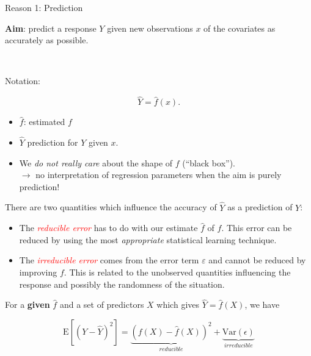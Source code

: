\documentclass[
  ignorenonframetext,
]{beamer}
\providecommand{\tightlist}{%
  \setlength{\itemsep}{0pt}\setlength{\parskip}{0pt}}
\begin{document}
\begin{frame}
\begin{block}{Reason 1: Prediction}
\protect\hypertarget{reason-1-prediction}{}
\(~\)

\textbf{Aim}: predict a response \(Y\) given new observations \(x\) of
the covariates as accurately as possible.

\(~\)

Notation:

\[\hat{Y} = \hat{f}(x).\]

\begin{itemize}
\item
  \(\hat{f}\): estimated \(f\)
\item
  \(\hat{Y}\) prediction for \(Y\) given \(x\).
\end{itemize}

\vspace{2mm}

\begin{itemize}
\tightlist
\item
  We \emph{do not really care} about the shape of \(f\) (``black
  box'').\\
  \(\rightarrow\) no interpretation of regression parameters when the
  aim is purely prediction!
\end{itemize}
\end{block}
\end{frame}

\begin{frame}
There are two quantities which influence the accuracy of \(\hat{Y}\) as
a prediction of \(Y\):

\begin{itemize}
\tightlist
\item
  The \emph{\textcolor{red}{reducible error}} has to do with our
  estimate \(\hat{f}\) of \(f\). This error can be reduced by using the
  most \emph{appropriate} statistical learning technique.
\item
  The \emph{\textcolor{red}{irreducible error}} comes from the error
  term \(\varepsilon\) and cannot be reduced by improving \(f\). This is
  related to the unobserved quantities influencing the response and
  possibly the randomness of the situation.
\end{itemize}

For a \textbf{given} \(\hat{f}\) and a set of predictors \(X\) which
gives \(\hat{Y}=\hat{f}(X)\), we have

\[\text{E}[(Y-\hat{Y})^2] = \underbrace{(f(X)-\hat{f}(X))^2}_{reducible} + \underbrace{\text{Var}(\epsilon)}_{irreducible}\]
\end{frame}
\end{document}
